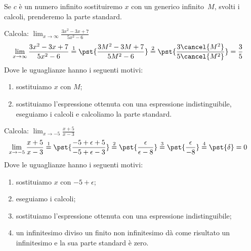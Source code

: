 Se $c$ è un numero infinito sostituiremo $x$ con un generico 
infinito~$M$, svolti i calcoli, prenderemo la parte standard.

\begin{esempio}
Calcola: \quad 
  \(\displaystyle \lim_{x \rightarrow \infty} \frac{3x^2-3x+7}{5x^2-6}\)
\begin{align*}
\lim_{x \rightarrow \infty} \frac{3x^2-3x+7}{5x^2-6} & \stackrel{1}{=} 
  \pst{\frac{3M^2-3M+7}{5M^2-6}} \stackrel{2}{=}  
  \pst{\frac{3\cancel{M^2}}{5\cancel{M^2}}} = \frac{3}{5}
\end{align*}
Dove le uguaglianze hanno i seguenti motivi:
\begin{enumerate} [nosep]
 \item sostituiamo $x$ con \(M\);
 \item sostituiamo l'espressione ottenuta con una espressione 
   indistinguibile, eseguiamo i calcoli e calcoliamo la parte standard.
\end{enumerate}
\end{esempio}

\begin{esempio}
Calcola: \quad 
  \(\displaystyle \lim_{x \rightarrow -5} \frac{x+5}{x-3}\)
\begin{align*}
\lim_{x \rightarrow -5} \frac{x+5}{x-3} & \stackrel{1}{=} 
  \pst{\frac{-5+\epsilon+5}{-5+\epsilon-3}} \stackrel{2}{=}  
  \pst{\frac{\epsilon}{\epsilon-8}} \stackrel{3}{=} 
  \pst{\frac{\epsilon}{-8}} \stackrel{4}{=} \pst{\delta} = 0
\end{align*}
Dove le uguaglianze hanno i seguenti motivi:
\begin{enumerate} [nosep]
 \item sostituiamo $x$ con \(-5+\epsilon\);
 \item eseguiamo i calcoli;
 \item sostituiamo l'espressione ottenuta con una espressione 
   indistinguibile;
 \item un infinitesimo diviso un finito non infinitesimo dà come risultato 
un infinitesimo e la sua parte standard è zero.
\end{enumerate}
\end{esempio}

